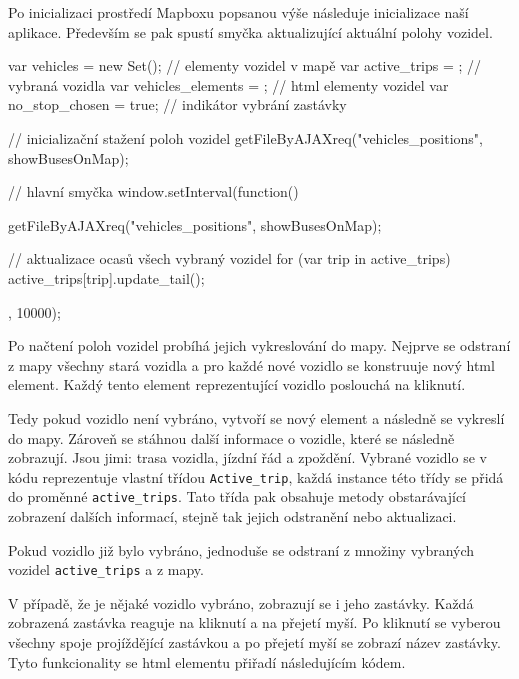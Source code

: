 \bigbreak


Po inicializaci prostředí Mapboxu popsanou výše následuje inicializace naší aplikace. Především se pak spustí smyčka aktualizující aktuální polohy vozidel.


\begin{code}[frame=none]
var vehicles = new Set(); // elementy vozidel v mapě
var active_trips = {}; // vybraná vozidla
var vehicles_elements = {}; // html elementy vozidel
var no_stop_chosen = true; // indikátor vybrání zastávky


// inicializační stažení poloh vozidel
getFileByAJAXreq("vehicles_positions", showBusesOnMap);


// hlavní smyčka
window.setInterval(function(){
getFileByAJAXreq("vehicles_positions", showBusesOnMap);


// aktualizace ocasů všech vybraný vozidel
for (var trip in active_trips){
  active_trips[trip].update_tail();
}
}, 10000);
\end{code}


Po načtení poloh vozidel probíhá jejich vykreslování do mapy. Nejprve se odstraní z mapy všechny stará vozidla a pro každé nové vozidlo se konstruuje nový \gls{html} element. Každý tento element reprezentující vozidlo poslouchá na kliknutí.


\bigbreak


Tedy pokud vozidlo není vybráno, vytvoří se nový element a následně se vykreslí do mapy. Zároveň se stáhnou další informace o vozidle, které se následně zobrazují. Jsou jimi: trasa vozidla, jízdní řád a zpoždění. Vybrané vozidlo se v kódu reprezentuje vlastní třídou \verb-Active_trip-, každá instance této třídy se přidá do proměnné \verb-active_trips-. Tato třída pak obsahuje metody obstarávající zobrazení dalších informací, stejně tak jejich odstranění nebo aktualizaci.


\bigbreak


Pokud vozidlo již bylo vybráno, jednoduše se odstraní z množiny vybraných vozidel \verb-active_trips- a z mapy.


\bigbreak


V případě, že je nějaké vozidlo vybráno, zobrazují se i jeho zastávky. Každá zobrazená zastávka reaguje na kliknutí a na přejetí myší. Po kliknutí se vyberou všechny spoje projíždějící zastávkou a po přejetí myší se zobrazí název zastávky. Tyto funkcionality se \gls{html} elementu přiřadí následujícím kódem.


